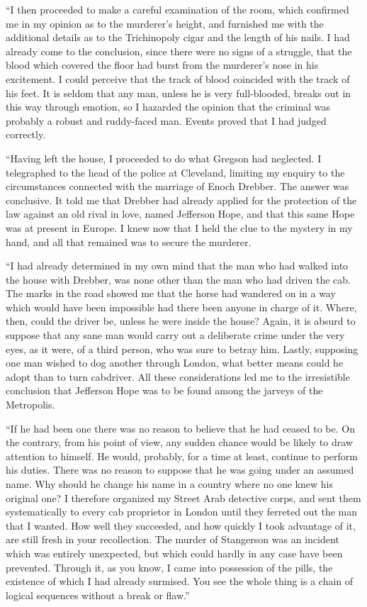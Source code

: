 \documentclass[12pt,english]{book}
\begin{document}
{}``I then proceeded to make a careful examination of the room, which
confirmed me in my opinion as to the murderer's height, and furnished
me with the additional details as to the Trichinopoly cigar and the
length of his nails. I had already come to the conclusion, since there
were no signs of a struggle, that the blood which covered the floor
had burst from the murderer's nose in his excitement. I could perceive
that the track of blood coincided with the track of his feet. It is
seldom that any man, unless he is very full-blooded, breaks out in
this way through emotion, so I hazarded the opinion that the criminal
was probably a robust and ruddy-faced man. Events proved that I had
judged correctly.

{}``Having left the house, I proceeded to do what Gregson had neglected.
I telegraphed to the head of the police at Cleveland, limiting my
enquiry to the circumstances connected with the marriage of Enoch
Drebber. The answer was conclusive. It told me that Drebber had already
applied for the protection of the law against an old rival in love,
named Jefferson Hope, and that this same Hope was at present in Europe.
I knew now that I held the clue to the mystery in my hand, and all
that remained was to secure the murderer.

{}``I had already determined in my own mind that the man who had
walked into the house with Drebber, was none other than the man who
had driven the cab. The marks in the road showed me that the horse
had wandered on in a way which would have been impossible had there
been anyone in charge of it. Where, then, could the driver be, unless
he were inside the house? Again, it is absurd to suppose that any
sane man would carry out a deliberate crime under the very eyes, as
it were, of a third person, who was sure to betray him. Lastly, supposing
one man wished to dog another through London, what better means could
he adopt than to turn cabdriver. All these considerations led me to
the irresistible conclusion that Jefferson Hope was to be found among
the jarveys of the Metropolis.

{}``If he had been one there was no reason to believe that he had
ceased to be. On the contrary, from his point of view, any sudden
chance would be likely to draw attention to himself. He would, probably,
for a time at least, continue to perform his duties. There was no
reason to suppose that he was going under an assumed name. Why should
he change his name in a country where no one knew his original one?
I therefore organized my Street Arab detective corps, and sent them
systematically to every cab proprietor in London until they ferreted
out the man that I wanted. How well they succeeded, and how quickly
I took advantage of it, are still fresh in your recollection. The
murder of Stangerson was an incident which was entirely unexpected,
but which could hardly in any case have been prevented. Through it,
as you know, I came into possession of the pills, the existence of
which I had already surmised. You see the whole thing is a chain of
logical sequences without a break or flaw.''
\end{document}

